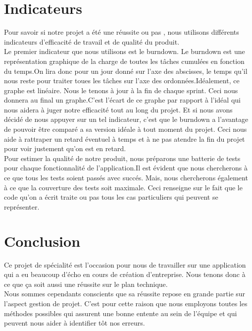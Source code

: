 \documentclass[11pt]{article}
\begin{document}
\section{Indicateurs}
Pour savoir si notre projet a été une réussite ou pas , nous utilisons différents indicateurs d'efficacité de travail et de qualité du produit. \\
Le premier indicateur que nous utilisons est le burndown. Le burndown est une représentation graphique de la charge de toutes les tâches cumulées en fonction du temps.On lira donc pour un jour donné sur l'axe des abscisses, le temps qu'il nous reste pour traiter toues les tâches  sur l'axe des ordonnées.Idéalement, ce graphe est linéaire. Nous le tenons à jour à la fin de chaque sprint. Ceci nous donnera au final un graphe.C'est l'écart de ce graphe par rapport à l'idéal qui nous aidera à juger notre efficacité tout au long du projet. Et si nous avons décidé de nous appuyer sur un tel indicateur, c'est que le burndown a l'avantage de pouvoir être comparé a sa version idéale à tout moment du projet. Ceci nous aide à rattraper un retard éventuel à temps et à ne pas atendre la fin du projet pour voir justement qu'on est en retard.\\
Pour estimer la qualité de notre produit, nous préparons une batterie de tests pour chaque fonctionnalité de l'application.Il est évident que nous chercherons à ce que tous les tests soient passés avec succés. Mais, nous chercherons également à ce que la couverture des tests soit maximale. Ceci renseigne sur le fait que le code qu'on a écrit traite ou pas tous les cas particuliers qui peuvent se représenter.\\
 
\section{Conclusion}
  Ce projet de spécialité est l'occasion pour nous de travailler sur une application qui a eu beaucoup d'écho en cours de création d'entreprise. Nous tenons donc à ce que ça soit aussi une réussite sur le plan technique.\\ 
Nous sommes cependants conscients que sa réussite repose en grande partie sur l'aspect gestion de projet. C'est pour cette raison que nous employons toutes les méthodes possibles qui assurent une bonne entente au sein de l'équipe et qui  peuvent nous aider à identifier tôt nos erreurs.   
\end{document}
